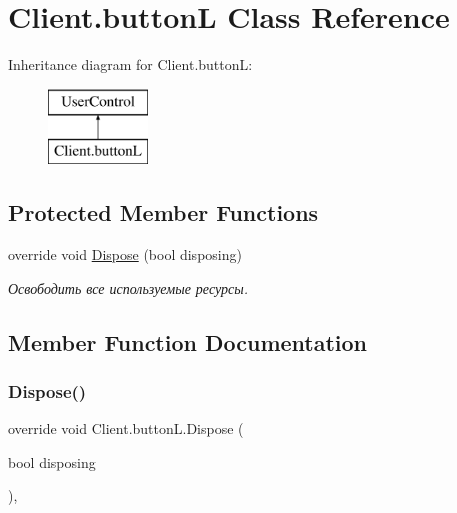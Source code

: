 \hypertarget{class_client_1_1button_l}{}\section{Client.\+buttonL Class Reference}
\label{class_client_1_1button_l}
Inheritance diagram for Client.\+buttonL\+:\begin{figure}[H]
\begin{center}
\leavevmode
\includegraphics[height=2.000000cm]{class_client_1_1button_l}
\end{center}
\end{figure}
\subsection*{Protected Member Functions}
\begin{DoxyCompactItemize}
\item 
override void \hyperlink{class_client_1_1button_l_ac6fa538126a25fce97996f189914812a}{Dispose} (bool disposing)
\begin{DoxyCompactList}\small\item\em Освободить все используемые ресурсы. \end{DoxyCompactList}\end{DoxyCompactItemize}


\subsection{Member Function Documentation}
\hypertarget{class_client_1_1button_l_ac6fa538126a25fce97996f189914812a}{}\label{class_client_1_1button_l_ac6fa538126a25fce97996f189914812a} 
\subsubsection{\texorpdfstring{Dispose()}{Dispose()}}
{\footnotesize\ttfamily override void Client.\+button\+L.\+Dispose (\begin{DoxyParamCaption}\item[{bool}]{disposing }\end{DoxyParamCaption})\hspace{0.3cm}{\ttfamily [inline]}, {\ttfamily [protected]}}



